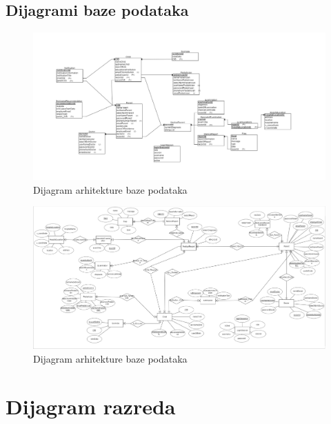 			\subsection{Dijagrami baze podataka}
				\begin{figure}[H]
					\includegraphics[scale=0.5]{dijagrami/ozdraviER.PNG} %
					\centering
					\caption{Dijagram arhitekture baze podataka}
					\label{fig:arhitektura-baze1}
				\end{figure}
				
				\begin{figure}[H]
					\includegraphics[scale=0.35]{dijagrami/ozdraviREL.PNG} %
					\centering
					\caption{Dijagram arhitekture baze podataka}
					\label{fig:arhitektura-baze2}
				\end{figure}
				\clearpage
			\eject
			
		\section{Dijagram razreda}
		
